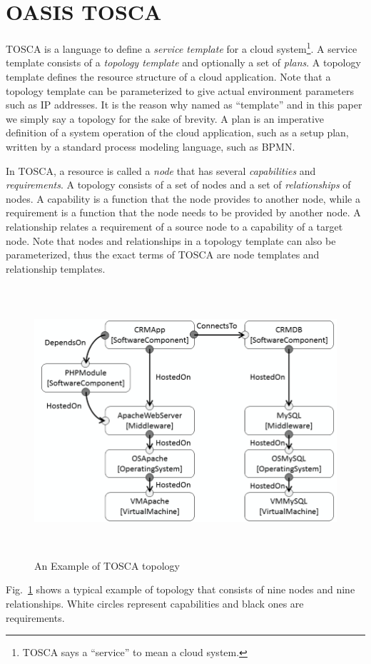 \documentclass[12pt]{report}
\begin{document}
\section{OASIS TOSCA}
\label{sec:TOSCA}
TOSCA is a language to define a {\it service template} for a cloud
system\footnote{TOSCA says a ``service'' to mean a cloud system.}. A
service template consists of a {\it topology template} and optionally
a set of {\it plans}. A topology template defines the resource
structure of a cloud application. Note that a topology template can be
parameterized to give actual environment parameters such as IP
addresses. It is the reason why named as ``template'' and in this
paper we simply say a topology for the sake of brevity. A plan is an
imperative definition of a system operation of the cloud application,
such as a setup plan, written by a standard process modeling language,
such as BPMN.

In TOSCA, a resource is called a {\it node} that has several {\it
  capabilities} and {\it requirements}. A topology consists of a set
of nodes and a set of {\it relationships} of nodes.  A capability is a
function that the node provides to another node, while a requirement
is a function that the node needs to be provided by another node. A
relationship relates a requirement of a source node to a capability of
a target node. Note that nodes and relationships in a topology
template can also be parameterized, thus the exact terms of TOSCA are
node templates and relationship templates.
\begin{figure}
\centering
\includegraphics[height=10cm,natwidth=640,natheight=429]{./extopology.png}
\caption{An Example of TOSCA topology}
\label{fig:exampletopology}
\end{figure}
Fig.~\ref{fig:exampletopology} shows a typical example of topology
that consists of nine nodes and nine relationships. White circles
represent capabilities and black ones are requirements.
\end{document}
